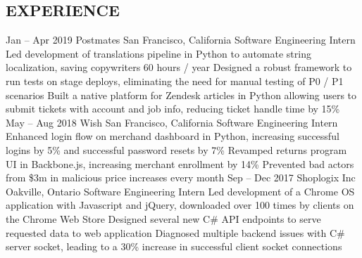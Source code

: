 \documentclass{aanguyen_res}
\begin{document}
  \begin{main}
    \vspace{0.2cm}%
    \section{EXPERIENCE}
      \begin{entrylist}
        \rightentry%
          {Jan -- Apr 2019}%
          {Postmates}%
          {San Francisco, California}%
          {Software Engineering Intern}%
          {\createlist%
            {%
              Led development of translations pipeline in Python to automate string localization, %
              saving copywriters 60 hours / year %
            }%
            {%
              Designed a robust framework to run tests on stage deploys, eliminating the need for %
              manual testing of P0 / P1 scenarios %
            }%
            {%
              Built a native platform for Zendesk articles in Python allowing users to submit tickets %
              with account and job info, reducing ticket handle time by 15\% %
            }%
          }
        \rightentry%
          {May -- Aug 2018}%
          {Wish}%
          {San Francisco, California}%
          {Software Engineering Intern}%
          {\createlist%
            {%
              Enhanced login flow on merchand dashboard in Python, increasing successful logins %
              by 5\% and successful password resets by 7\% %
            }%
            {%
              Revamped returns program UI in Backbone.js, increasing merchant enrollment %
              by 14\% %
            }%
            {%
              Prevented bad actors from \$3m in malicious price increases every month %
            }%
          }
        \rightentry%
          {Sep -- Dec 2017}%
          {Shoplogix Inc}%
          {Oakville, Ontario}%
          {Software Engineering Intern}%
          {\createlist%
            {%
              Led development of a Chrome OS application with Javascript and jQuery, downloaded %
              over 100 times by clients on the Chrome Web Store %
            }%
            {%
              Designed several new C\# API endpoints to serve requested data to web application %
            }%
            {%
              Diagnosed multiple backend issues with C\# server socket, leading to a 30\% increase %
              in successful client socket connections %
            }%
          }
      \end{entrylist}

\end{main}
\end{document}
